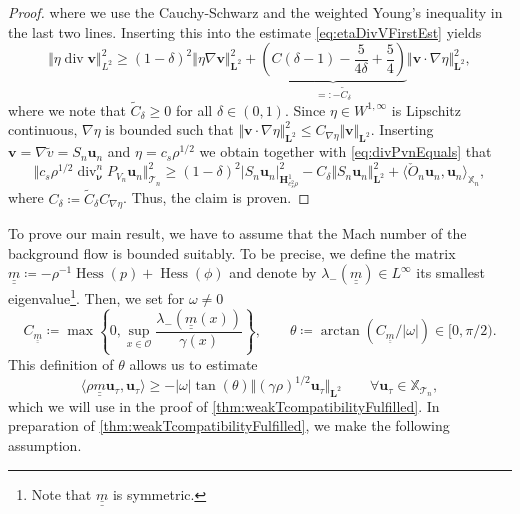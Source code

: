 \documentclass{m2an}
\newcommand{\dom}{\mathcal{O}} %
\newcommand{\nv}{\boldsymbol{\nu}}
\renewcommand{\u}{\mathbf{u}}
\renewcommand{\v}{\mathbf{v}}
\renewcommand{\div}{\operatorname{div}}
\DeclareMathOperator{\hess}{Hess}
\newcommand{\calT}{\mathcal{T}}
\newcommand{\X}{\mathbb{X}}
\newcommand{\Xn}{\mathbb{X}_n}
\newcommand{\XT}{\X_{\mathcal{T}_n}}
\newcommand{\bH}{{\mathbf H}}
\newcommand{\bL}{\mathbf{L}}
\newcommand{\Tn}{\calT_n}
\newcommand{\spl}{\langle}
\newcommand{\spr}{\rangle}
\newcommand{\ddiv}{\div_{\nv}^n}
\newcommand{\matii}{\underline{\underline{m}}}
\newcommand{\Sol}{S_n}
\theoremstyle{plain}
\theoremstyle{definition}
\begin{document}
\begin{proof}
   where we use the Cauchy-Schwarz and the weighted Young's inequality in the last two lines. Inserting this into the estimate \eqref{eq:etaDivVFirstEst} yields 
   \begin{equation*}
      \Vert \eta \div \v \Vert^2_{L^2} \ge  (1-\delta)^2 \Vert \eta \nabla \v \Vert^2_{\bL^2} + \underbrace{\left( C(\delta-1) - \frac{5}{4\delta} + \frac{5}{4} \right)}_{=: - \tilde{C}_{\delta}} \Vert \v \cdot \nabla \eta \Vert^2_{\bL^2},
   \end{equation*}
   where we note that $\tilde{C}_{\delta} \ge 0$ for all $\delta \in (0,1)$. Since $\eta \in W^{1,\infty}$ is Lipschitz continuous, $\nabla \eta$ is bounded such that 
   $\Vert \v \cdot \nabla \eta \Vert^2_{\bL^2} \le C_{\nabla \eta} \Vert \v \Vert_{\bL^2}$. Inserting $\v = \nabla \tilde{v} = \Sol \u_n$ and $\eta = c_s \rho^{1/2}$ we obtain together with \eqref{eq:divPvnEquals} that 
   \begin{equation}
      \! \! \Vert c_s \rho^{1/2} \! \ddiv P_{V_n} \! \u_n \Vert^2_{\Tn} \ge (1\!-\!\delta)^2 \vert \Sol \u_n \vert^2_{\bH^1_{c_s^2 \rho}} \!  \! \! \! \!-\! C_{\delta} \Vert \Sol \u_n \Vert^2_{\bL^2} + \spl \check{O}_n \u_n, \!\u_n \spr_{\Xn}\!,
   \end{equation}
   where $C_{\delta} \coloneqq \tilde{C}_{\delta} C_{\nabla \eta}$. Thus, the claim is proven.
\end{proof}
 
To prove our main result, we have to assume that the Mach number of the background flow is bounded suitably. To be precise, we define the matrix $\matii \coloneqq - \rho^{-1} \hess(p) + \hess(\phi)$ and denote by $\lambda_{-}(\matii) \in L^\infty$ its smallest eigenvalue\footnote{Note that $\matii$ is symmetric.}. Then, we set for $\omega \not = 0$
\begin{equation} \label{eq:def:theta}
   C_{\matii} \coloneqq \max \left\{ 0, \sup_{x \in \dom} \frac{\lambda_{-}(\matii(x))}{\gamma(x)} \right\}, \qquad \theta \coloneqq \arctan(C_{\matii}/\vert \omega \vert) \in [0,\pi/2).
\end{equation}
This definition of $\theta$ allows us to estimate 
\begin{equation}\label{eq:thetaEstimate}
    \spl \rho \matii \u_{\tau}, \u_{\tau} \spr \ge - \vert \omega \vert \tan(\theta) \Vert (\gamma \rho)^{1/2} \u_{\tau} \Vert_{\bL^2} \qquad \forall \u_{\tau} \in \XT,
\end{equation}
which we will use in the proof of \cref{thm:weakTcompatibilityFulfilled}. In preparation of \cref{thm:weakTcompatibilityFulfilled}, we make the following assumption. 
\end{document}
